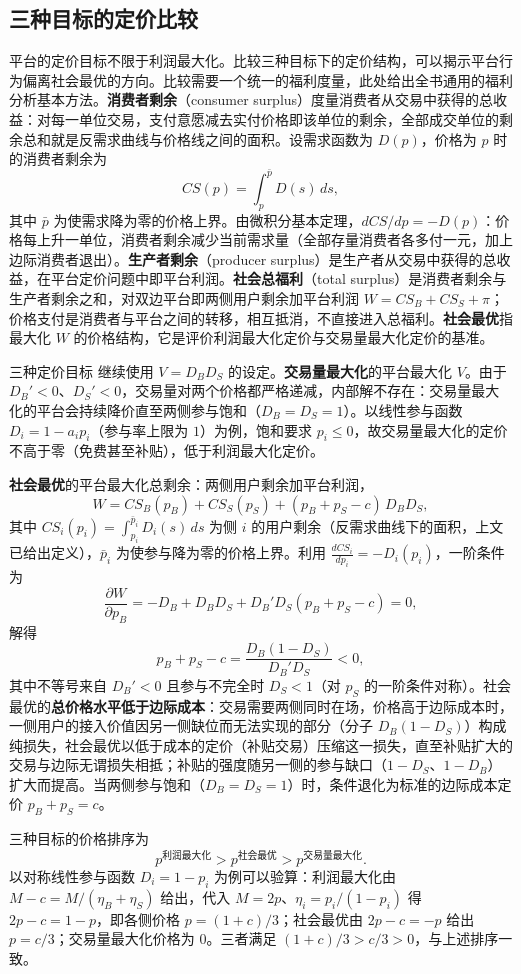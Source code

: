 \subsection{三种目标的定价比较}

平台的定价目标不限于利润最大化。比较三种目标下的定价结构，可以揭示平台行为偏离社会最优的方向。比较需要一个统一的福利度量，此处给出全书通用的福利分析基本方法。\textbf{消费者剩余}（consumer surplus）度量消费者从交易中获得的总收益：对每一单位交易，支付意愿减去实付价格即该单位的剩余，全部成交单位的剩余总和就是反需求曲线与价格线之间的面积。设需求函数为 $D(p)$，价格为 $p$ 时的消费者剩余为
\[
CS(p) = \int_{p}^{\bar p} D(s)\,ds,
\]
其中 $\bar p$ 为使需求降为零的价格上界。由微积分基本定理，$dCS/dp = -D(p)$：价格每上升一单位，消费者剩余减少当前需求量（全部存量消费者各多付一元，加上边际消费者退出）。\textbf{生产者剩余}（producer surplus）是生产者从交易中获得的总收益，在平台定价问题中即平台利润。\textbf{社会总福利}（total surplus）是消费者剩余与生产者剩余之和，对双边平台即两侧用户剩余加平台利润 $W = CS_B + CS_S + \pi$；价格支付是消费者与平台之间的转移，相互抵消，不直接进入总福利。\textbf{社会最优}指最大化 $W$ 的价格结构，它是评价利润最大化定价与交易量最大化定价的基准。

\begin{derivation}{三种定价目标}{}
继续使用 $V = D_BD_S$ 的设定。\textbf{交易量最大化}的平台最大化 $V$。由于 $D_B' < 0$、$D_S' < 0$，交易量对两个价格都严格递减，内部解不存在：交易量最大化的平台会持续降价直至两侧参与饱和（$D_B = D_S = 1$）。以线性参与函数 $D_i = 1 - a_ip_i$（参与率上限为 $1$）为例，饱和要求 $p_i \le 0$，故交易量最大化的定价不高于零（免费甚至补贴），低于利润最大化定价。

\textbf{社会最优}的平台最大化总剩余：两侧用户剩余加平台利润，
\[
W = CS_B(p_B) + CS_S(p_S) + (p_B+p_S-c)\,D_BD_S,
\]
其中 $CS_i(p_i) = \int_{p_i}^{\bar p_i} D_i(s)\,ds$ 为侧 $i$ 的用户剩余（反需求曲线下的面积，上文已给出定义），$\bar p_i$ 为使参与降为零的价格上界。利用 $\frac{dCS_i}{dp_i} = -D_i(p_i)$，一阶条件为
\[
\frac{\partial W}{\partial p_B} = -D_B + D_BD_S + D_B'D_S(p_B+p_S-c) = 0,
\]
解得
\[
p_B+p_S-c = \frac{D_B(1-D_S)}{D_B'D_S} < 0,
\]
其中不等号来自 $D_B' < 0$ 且参与不完全时 $D_S < 1$（对 $p_S$ 的一阶条件对称）。社会最优的\textbf{总价格水平低于边际成本}：交易需要两侧同时在场，价格高于边际成本时，一侧用户的接入价值因另一侧缺位而无法实现的部分（分子 $D_B(1-D_S)$）构成纯损失，社会最优以低于成本的定价（补贴交易）压缩这一损失，直至补贴扩大的交易与边际无谓损失相抵；补贴的强度随另一侧的参与缺口（$1-D_S$、$1-D_B$）扩大而提高。当两侧参与饱和（$D_B = D_S = 1$）时，条件退化为标准的边际成本定价 $p_B+p_S = c$。

三种目标的价格排序为
\[
p^{\text{利润最大化}} > p^{\text{社会最优}} > p^{\text{交易量最大化}}.
\]
以对称线性参与函数 $D_i = 1-p_i$ 为例可以验算：利润最大化由 $M-c = M/(\eta_B+\eta_S)$ 给出，代入 $M = 2p$、$\eta_i = p_i/(1-p_i)$ 得 $2p-c = 1-p$，即各侧价格 $p = (1+c)/3$；社会最优由 $2p-c = -p$ 给出 $p = c/3$；交易量最大化价格为 $0$。三者满足 $(1+c)/3 > c/3 > 0$，与上述排序一致。
\end{derivation}

